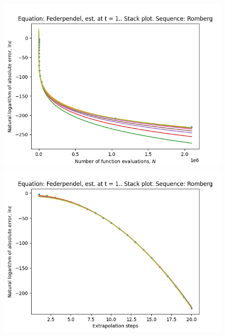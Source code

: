 \begin{figure}[H]
\centering
\begin{minipage}{0.45\textwidth}
\centering
\includegraphics[scale=0.45]{../results/emr_plots/federpendel_1_hp_romberg_stack.png}
\end{minipage}
\begin{minipage}{0.45\textwidth}
\centering
\includegraphics[scale=0.45]{../results/emr_plots/federpendel_1_hp_romberg_steps_stack.png}
\end{minipage}
\end{figure}


